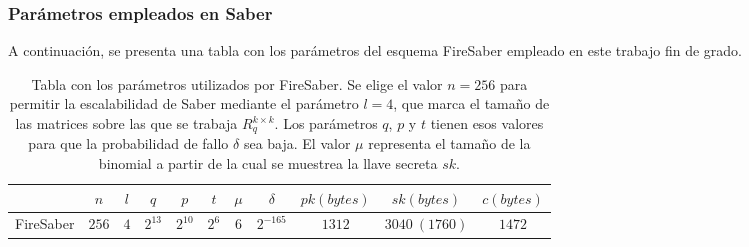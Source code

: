 \subsubsection{Parámetros empleados en Saber}
A continuación, se presenta una tabla con los parámetros del esquema FireSaber empleado en este trabajo fin de grado.
\begin{table}[H]
	\centering
	\renewcommand{\arraystretch}{1.2}
	\begin{tabular}{lcccccccccc}
		\hline
		&\(n\)&\(l\)&\(q\)&\(p\)&\(t\)&\(\mu\)&\(\delta\)&\(pk (bytes)\)&\(sk (bytes)\)&\(c (bytes)\)\\
		\hline
		FireSaber&\(256\)&\(4\)&\(2^{13}\)&\(2^{10}\)&\(2^{6}\)&\(6\)&\(2^{-165}\)&\(1312\)&\(3040 \ (1760)\)&\(1472\)\\
		\hline
	\end{tabular}
	\caption{Tabla con los parámetros utilizados por FireSaber. Se elige el valor \(n=256\) para permitir la escalabilidad de Saber mediante el parámetro \(l=4\), que marca el tamaño de las matrices sobre las que se trabaja \(R_q^{k\times k}\). Los parámetros \(q\), \(p\) y  \(t\) tienen esos valores para que la probabilidad de fallo \(\delta\) sea baja. El valor \(\mu\) representa el tamaño de la binomial a partir de la cual se muestrea la llave secreta \(sk\).}
	\label{tab:SaberParams}
\end{table}

